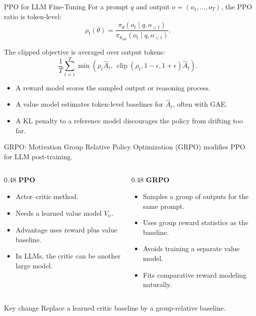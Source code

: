 \documentclass[aspectratio=169]{beamer}
\begin{document}
\begin{frame}{PPO for LLM Fine-Tuning}
\small
For a prompt $q$ and output $o=(o_1,\ldots,o_T)$, the PPO ratio is token-level:
\[
\rho_t(\theta)
=
\frac{\pi_\theta(o_t\mid q,o_{<t})}
{\pi_{\theta_{\mathrm{old}}}(o_t\mid q,o_{<t})}.
\]

\vspace{0.4em}
The clipped objective is averaged over output tokens:
\[
\frac{1}{T}\sum_{t=1}^{T}
\min\left(
\rho_t\widehat A_t,\,
\operatorname{clip}(\rho_t,1-\epsilon,1+\epsilon)\widehat A_t
\right).
\]

\vspace{0.5em}
\begin{itemize}
    \item A reward model scores the sampled output or reasoning process.
    \item A value model estimates token-level baselines for $\widehat A_t$, often with GAE.
    \item A KL penalty to a reference model discourages the policy from drifting too far.
\end{itemize}
\end{frame}

\begin{frame}{GRPO: Motivation}
\small
Group Relative Policy Optimization (GRPO) modifies PPO for LLM post-training.

\vspace{0.4em}
\begin{columns}[T,onlytextwidth]
\begin{column}{0.48\textwidth}
\textbf{PPO}
\begin{itemize}
    \item Actor--critic method.
    \item Needs a learned value model $V_\psi$.
    \item Advantage uses reward plus value baseline.
    \item In LLMs, the critic can be another large model.
\end{itemize}
\end{column}
\begin{column}{0.48\textwidth}
\textbf{GRPO}
\begin{itemize}
    \item Samples a group of outputs for the same prompt.
    \item Uses group reward statistics as the baseline.
    \item Avoids training a separate value model.
    \item Fits comparative reward modeling naturally.
\end{itemize}
\end{column}
\end{columns}

\vspace{0.5em}
\begin{block}{Key change}
Replace a learned critic baseline by a group-relative baseline.
\end{block}
\end{frame}
\end{document}
